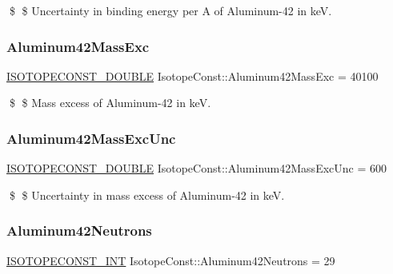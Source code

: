 \$ \$ Uncertainty in binding energy per A of Aluminum-\/42 in keV. \mbox{\label{group___isotope_const-_aluminum-_al42_gae91ab27a80f7108a70efd51780e551be}} 
\subsubsection{\texorpdfstring{Aluminum42\+Mass\+Exc}{Aluminum42MassExc}}
{\footnotesize\ttfamily \mbox{\hyperlink{group___isotope_const-_macros_ga8f45a7272ce02c0b4c65c44636ed719a}{I\+S\+O\+T\+O\+P\+E\+C\+O\+N\+S\+T\+\_\+\+D\+O\+U\+B\+LE}} Isotope\+Const\+::\+Aluminum42\+Mass\+Exc = 40100}

\$ \$ Mass excess of Aluminum-\/42 in keV. \mbox{\label{group___isotope_const-_aluminum-_al42_ga07cc6a15936a17283003f123e115b57e}} 
\subsubsection{\texorpdfstring{Aluminum42\+Mass\+Exc\+Unc}{Aluminum42MassExcUnc}}
{\footnotesize\ttfamily \mbox{\hyperlink{group___isotope_const-_macros_ga8f45a7272ce02c0b4c65c44636ed719a}{I\+S\+O\+T\+O\+P\+E\+C\+O\+N\+S\+T\+\_\+\+D\+O\+U\+B\+LE}} Isotope\+Const\+::\+Aluminum42\+Mass\+Exc\+Unc = 600}

\$ \$ Uncertainty in mass excess of Aluminum-\/42 in keV. \mbox{\label{group___isotope_const-_aluminum-_al42_ga19bab0916a0e4aa87b06c4b292fffdd7}} 
\subsubsection{\texorpdfstring{Aluminum42\+Neutrons}{Aluminum42Neutrons}}
{\footnotesize\ttfamily \mbox{\hyperlink{group___isotope_const-_macros_ga5f18360b3e99483a35c32d789e62621c}{I\+S\+O\+T\+O\+P\+E\+C\+O\+N\+S\+T\+\_\+\+I\+NT}} Isotope\+Const\+::\+Aluminum42\+Neutrons = 29}

